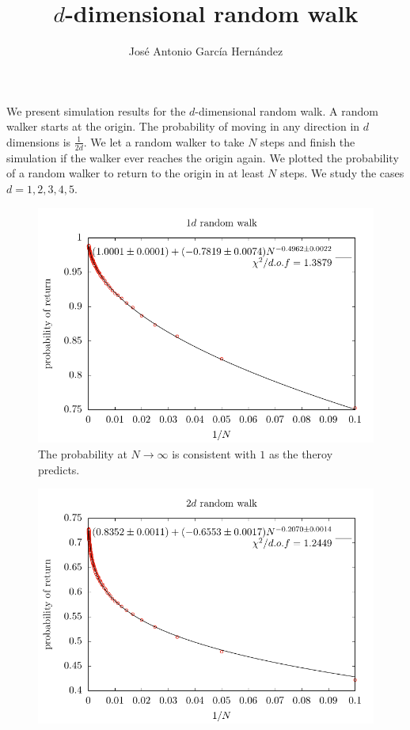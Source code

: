 \documentclass[12pt,a4paper]{article}
\author{José Antonio García Hernández}
\title{$d$-dimensional random walk}
\begin{document}
\maketitle

We present simulation results for the $d$-dimensional random walk. A random walker starts at the origin. The probability of moving in any direction in $d$ dimensions is $\frac{1}{2d}$. We let a random walker to take $N$ steps and finish the simulation if the walker ever reaches the origin again. We plotted the probability of a random walker to return to the origin in at least $N$ steps. We study the cases $d = 1,2,3,4,5$. 

\begin{center}
\begin{figure}
\includegraphics[scale=1]{1d_random_walk.pdf}
\caption{The probability at $N\to \infty$ is consistent with $1$ as the theroy predicts.}
\end{figure}
\end{center}


\begin{center}
\begin{figure}
\includegraphics[scale=1]{2d_random_walk.pdf}
\end{figure}
\end{center}
\end{document}
